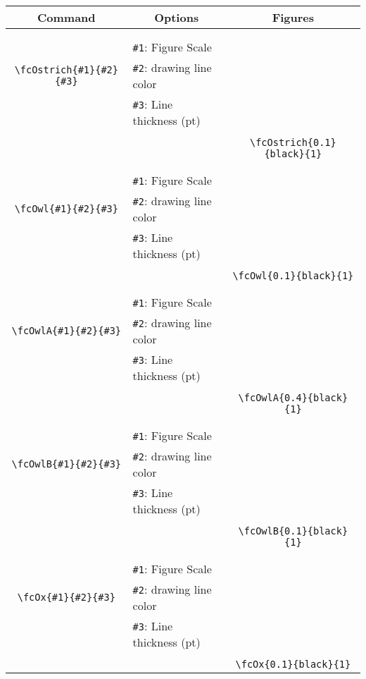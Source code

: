 \documentclass[x11names]{article}
\begin{document}
\begin{table}[H]\centering\begin{tabular}{|c|l|c|}\hline {\bf Command}& \multicolumn{1}{c|}{{\bf Options}} & {\bf Figures}\\  \hline	&&\multirow{5}{*}{\fcOstrich{0.1}{black}{1}}\\	&&\\	&\verb|#1|: Figure Scale &\\	\verb|\fcOstrich{#1}{#2}{#3}|&	\verb|#2|: drawing line color &\\	&\verb|#3|: Line thickness (pt) &\\ &&\\&&	\verb|\fcOstrich{0.1}{black}{1}|\\\hline 	
	&&\multirow{5}{*}{\fcOwl{0.1}{black}{1}}\\	&&\\	&\verb|#1|: Figure Scale &\\	\verb|\fcOwl{#1}{#2}{#3}|&	\verb|#2|: drawing line color &\\	&\verb|#3|: Line thickness (pt) &\\ &&\\&&	\verb|\fcOwl{0.1}{black}{1}|\\\hline 	
	&&\multirow{5}{*}{\fcOwlA{0.4}{black}{1}}\\	&&\\	&\verb|#1|: Figure Scale &\\	\verb|\fcOwlA{#1}{#2}{#3}|&	\verb|#2|: drawing line color &\\	&\verb|#3|: Line thickness (pt) &\\ &&\\&&	\verb|\fcOwlA{0.4}{black}{1}|\\\hline 	
	&&\multirow{5}{*}{\fcOwlB{0.1}{black}{1}}\\	&&\\	&\verb|#1|: Figure Scale &\\	\verb|\fcOwlB{#1}{#2}{#3}|&	\verb|#2|: drawing line color &\\	&\verb|#3|: Line thickness (pt) &\\ &&\\&&	\verb|\fcOwlB{0.1}{black}{1}|\\\hline 	
	&&\multirow{5}{*}{\fcOx{0.1}{black}{1}}\\	&&\\	&\verb|#1|: Figure Scale &\\	\verb|\fcOx{#1}{#2}{#3}|&	\verb|#2|: drawing line color &\\	&\verb|#3|: Line thickness (pt) &\\ &&\\&&	\verb|\fcOx{0.1}{black}{1}|\\\hline 	

\end{tabular}
\end{table}
\end{document}
